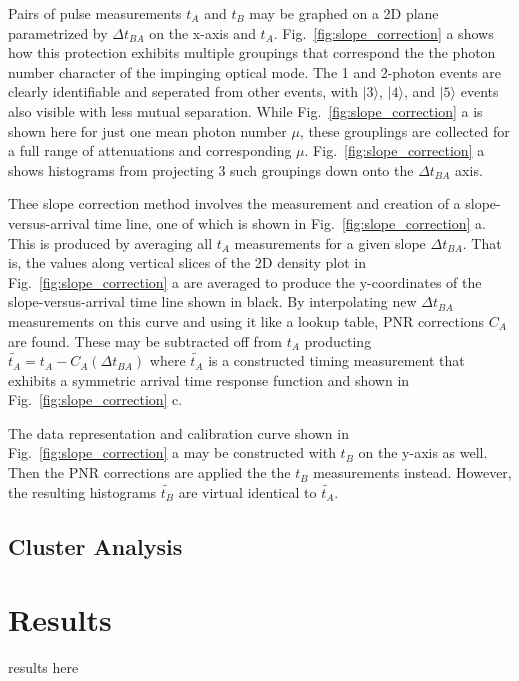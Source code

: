\documentclass[11pt]{caltech_thesis} %
\begin{document}
Pairs of pulse measurements $t_A$ and $t_B$ may be graphed on a 2D plane
parametrized by $\Delta t_{BA}$ on the x-axis and $t_A$.
Fig.~\ref{fig:slope_correction} a shows how this protection exhibits
multiple groupings that correspond the the photon number character of
the impinging optical mode. The 1 and 2-photon events are clearly
identifiable and seperated from other events, with $|3\rangle$,
$|4\rangle$, and $|5\rangle$ events also visible with less mutual
separation. While Fig.~\ref{fig:slope_correction} a is shown here for
just one mean photon number $\mu$, these grouplings are collected for a
full range of attenuations and corresponding $\mu$.
Fig.~\ref{fig:slope_correction} a shows histograms from projecting 3
such groupings down onto the $\Delta t_{BA}$ axis.

Thee slope correction method involves the measurement and creation of a
slope-versus-arrival time line, one of which is shown in
Fig.~\ref{fig:slope_correction} a. This is produced by averaging all
$t_A$ measurements for a given slope $\Delta t_{BA}$. That is, the
values along vertical slices of the 2D density plot in
Fig.~\ref{fig:slope_correction} a are averaged to produce the
y-coordinates of the slope-versus-arrival time line shown in black. By
interpolating new $\Delta t_{BA}$ measurements on this curve and using
it like a lookup table, PNR corrections $C_A$ are found. These may be
subtracted off from $t_A$ producting
$\tilde{t_A} = t_A - C_A(\Delta t_{BA})$ where $\tilde{t_A}$ is a
constructed timing measurement that exhibits a symmetric arrival time
response function and shown in Fig.~\ref{fig:slope_correction} c.~

The data representation and calibration curve shown in
Fig.~\ref{fig:slope_correction} a may be constructed with $t_B$ on the
y-axis as well. Then the PNR corrections are applied the the $t_B$
measurements instead. However, the resulting histograms $\tilde{t_B}$
are virtual identical to $\tilde{t_A}$.

\hypertarget{cluster-analysis}{%
\subsection{Cluster Analysis}\label{cluster-analysis}}

\hypertarget{results}{%
\section{Results}\label{results}}

results here
\end{document}
